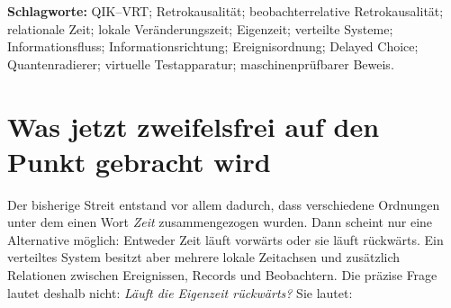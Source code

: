 \documentclass[11pt,a4paper]{article}
\theoremstyle{remark}
\newcommand{\recv}{\prec_{\!O}^{R}}
\newcommand{\sourceord}{\prec^{\theta}}
\begin{document}
\begin{otherlanguage}{english}
\begin{abstract}
This paper gives a precise definition and existence theorem for
observer-relative retrocausality in QIK--VRT. An observer advances monotonically
in observer-local change time (QIK--VRT operationally: Eigenzeit) while
authentic information records may arrive in an order
opposite to the source-event order bound by those records. Ordinally,
\(r^{+}\recv r^{-}\) although \(r^{-}\sourceord r^{+}\); metrically,
\(\Delta\tau_O>0\), \(\Delta\theta<0\), and hence \(v_I^O<0\). This negative
information-reference direction is what the present work calls
observer-relative retrocausality. In a physical realization, this parameter
may additionally be calibrated to metric proper time along a timelike
worldline. The theorem is proved, reproduced by an
executable finite witness, and constructively realized with future-directed
signal paths of unequal latency. No reversal of proper time, past overwrite,
causal loop, or controllable signal into an observer's causal past is inferred.
Delayed-choice and quantum-eraser experiments instantiate the adjoining
physical structure in which later context makes a decision-sufficient
classification of earlier records available while leaving the earlier local
marginal unchanged. The universal correspondence of this structure to the
cosmos is stated separately as Ingolf Lohmann's QIK--VRT correspondence thesis.
\end{abstract}
\end{otherlanguage}

\textbf{Schlagworte:} QIK--VRT; Retrokausalität; beobachterrelative
Retrokausalität; relationale Zeit; lokale Veränderungszeit; Eigenzeit;
verteilte Systeme; Informationsfluss; Informationsrichtung; Ereignisordnung;
Delayed Choice; Quantenradierer; virtuelle Testapparatur;
maschinenprüfbarer Beweis.

\clearpage
\begingroup
\setlength{\parskip}{0pt}
\small
\tableofcontents
\endgroup
\clearpage

\section{Was jetzt zweifelsfrei auf den Punkt gebracht wird}

Der bisherige Streit entstand vor allem dadurch, dass verschiedene Ordnungen
unter dem einen Wort \emph{Zeit} zusammengezogen wurden. Dann scheint nur eine
Alternative möglich: Entweder Zeit läuft vorwärts oder sie läuft rückwärts.
Ein verteiltes System besitzt aber mehrere lokale Zeitachsen und zusätzlich
Relationen zwischen Ereignissen, Records und Beobachtern. Die präzise Frage
lautet deshalb nicht: \emph{Läuft die Eigenzeit rückwärts?} Sie lautet:
\end{document}
